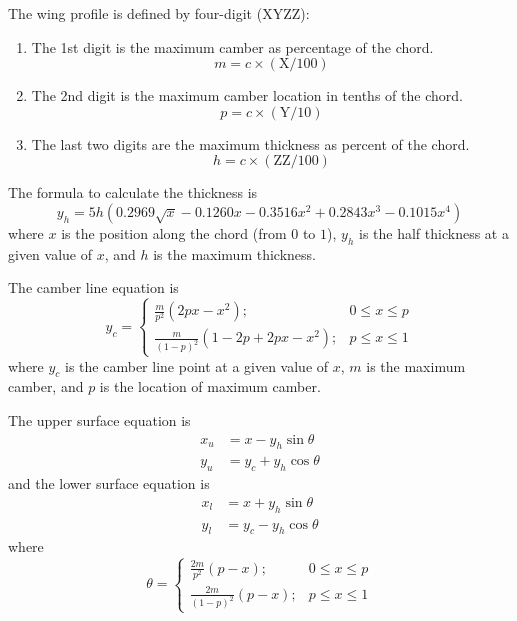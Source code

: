\documentclass{turgon}
\begin{document}
The wing profile is defined by four-digit ($\mathrm{XYZZ}$):
\begin{enumerate}
    \item
    The 1st digit is the maximum camber as percentage of the chord.
    \begin{equation*}
        m = c \times (\mathrm{X}/100)
    \end{equation*}
    \item
    The 2nd digit is the maximum camber location in tenths of the chord.
    \begin{equation*}
        p = c \times (\mathrm{Y}/10)
    \end{equation*}
    \item
    The last two digits are the maximum thickness as percent of the chord.
    \begin{equation*}
        h = c \times (\mathrm{ZZ}/100)
    \end{equation*}
\end{enumerate}

The formula to calculate the thickness is
\begin{equation*}
    y_h = 5h\left(0.2969\sqrt{x}-0.1260x-0.3516x^2+0.2843x^3-0.1015x^4\right)
\end{equation*}
where $x$ is the position along the chord (from $0$ to $1$), $y_h$ is the
half thickness at a given value of $x$, and $h$ is the maximum thickness.

The camber line equation is
\begin{equation*}
    y_c =
    \begin{cases}
    \frac{m}{p^2} (2px - x^2); & 0 \leq x \leq p \\
    \frac{m}{(1-p)^2} (1 - 2p + 2px - x^2);  &  p \leq x \leq 1
    \end{cases}
\end{equation*}
where $y_c$ is the camber line point at a given value of $x$, $m$ is the
maximum camber, and $p$ is the location of maximum camber.

The upper surface equation is
\begin{align}
    x_u &= x - y_h \sin\theta
    \label{e:naca:up_x}
    \\
    y_u &= y_c + y_h \cos\theta
    \label{e:naca:up_y}
\end{align}
and the lower surface equation is
\begin{align*}
    x_l &= x + y_h \sin\theta
    \\
    y_l &= y_c - y_h \cos\theta
\end{align*}
where
\begin{equation*}
    \theta =
    \begin{cases}
    \frac{2m}{p^2} (p - x); & 0 \leq x \leq p \\
    \frac{2m}{(1-p)^2} (p - x);  &  p \leq x \leq 1
    \end{cases}
\end{equation*}
\end{document}
